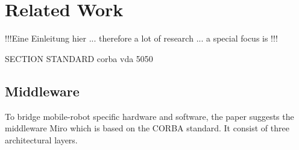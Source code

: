 \chapter{Related Work}
\label{cha:relatedwork}

!!!Eine Einleitung hier ... therefore a lot of research ... a special focus is !!!

SECTION STANDARD
corba
vda 5050

\section{Middleware}
To bridge mobile-robot specific hardware and software, the paper \cite{utz_miro_2002} suggests the middleware Miro which is based on the CORBA standard. It consist of three architectural layers.